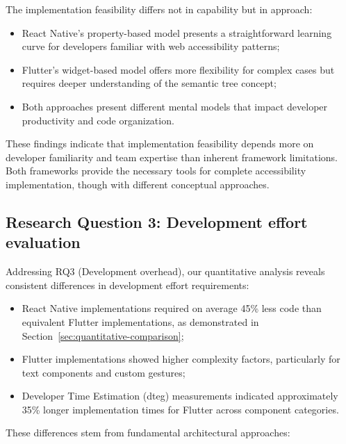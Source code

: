 The implementation feasibility differs not in capability but in approach:

\begin{itemize}
    \item React Native's property-based model presents a straightforward learning curve for developers familiar with web accessibility patterns;
    
    \item Flutter's widget-based model offers more flexibility for complex cases but requires deeper understanding of the semantic tree concept;
    
    \item Both approaches present different mental models that impact developer productivity and code organization.
\end{itemize}

These findings indicate that implementation feasibility depends more on developer familiarity and team expertise than inherent framework limitations. Both frameworks provide the necessary tools for complete accessibility implementation, though with different conceptual approaches.

\subsection{Research Question 3: Development effort evaluation}
\label{subsec:development-effort}

Addressing RQ3 (Development overhead), our quantitative analysis reveals consistent differences in development effort requirements:

\begin{itemize}
    \item React Native implementations required on average 45\% less code than equivalent Flutter implementations, as demonstrated in Section~\ref{sec:quantitative-comparison};
    
    \item Flutter implementations showed higher complexity factors, particularly for text components and custom gestures;
    
    \item Developer Time Estimation (\gls{dteg}) measurements indicated approximately 35\% longer implementation times for Flutter across component categories.
\end{itemize}

These differences stem from fundamental architectural approaches:

